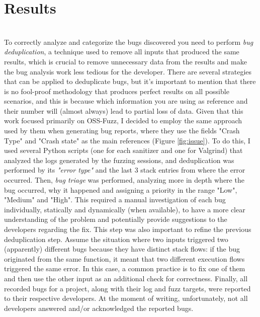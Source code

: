 \chapter{Results} \label{chap_4}
\ \\
To correctly analyze and categorize the bugs discovered you need to perform \textit{bug deduplication}, a technique used to remove all inputs that produced the same results, which is crucial to remove unnecessary data from the results and make the bug analysis work less tedious for the developer.
\newline \newline
There are several strategies that can be applied to deduplicate bugs, but it's important to mention that there is no fool-proof methodology that produces perfect results on all possible scenarios, and this is because which information you are using as reference and their number will (almost always) lead to partial loss of data.
\newline
Given that this work focused primarily on OSS-Fuzz, I decided to employ the same approach used by them when generating bug reports, where they use the fields "Crash Type" and "Crash state" as the main references (Figure \ref{fig:issue}).
\newline
To do this, I used several Python scripts (one for each sanitizer and one for Valgrind) that analyzed the logs generated by the fuzzing sessions, and deduplication was performed by its \textit{"error type"} and the last 3 stack entries from where the error occurred.
\newline \newline
Then, \textit{bug triage} was performed, analyzing more in depth where the bug occurred, why it happened and assigning a priority in the range "Low", "Medium" and "High". This required a manual investigation of each bug individually, statically and dynamically (when available), to have a more clear understanding of the problem and potentially provide suggestions to the developers regarding the fix.
\newline
This step was also important to refine the previous deduplication step.
\newline
Assume the situation where two inputs triggered two (apparently) different bugs because they have distinct stack flows: if the bug originated from the same function, it meant that two different execution flows triggered the same error. In this case, a common practice is to fix one of them and then use the other input as an additional check for correctness.
\newline \newline
Finally, all recorded bugs for a project, along with their log and fuzz targets, were reported to their respective developers.
\newline \newline
At the moment of writing, unfortunately, not all developers answered and/or acknowledged the reported bugs.






